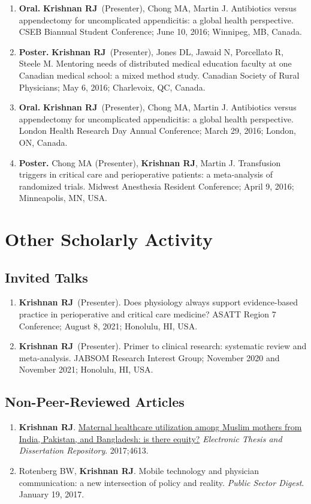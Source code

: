 \documentclass[10.5pt,letterpaper]{article}
\newcommand{\myname}{\textbf{Krishnan RJ}}
\begin{document}
\begin{enumerate}
\item \textbf{Oral.} \myname\ (Presenter), Chong MA, Martin J. Antibiotics versus appendectomy for uncomplicated appendicitis: a global health perspective. CSEB Biannual Student Conference; June 10, 2016; Winnipeg, MB, Canada.
\item \textbf{Poster.} \myname\ (Presenter), Jones DL, Jawaid N, Porcellato R, Steele M. Mentoring needs of distributed medical education faculty at one Canadian medical school: a mixed method study. Canadian Society of Rural Physicians; May 6, 2016; Charlevoix, QC, Canada.
\item \textbf{Oral.} \myname\ (Presenter), Chong MA, Martin J. Antibiotics versus appendectomy for uncomplicated appendicitis: a global health perspective. London Health Research Day Annual Conference; March 29, 2016; London, ON, Canada.
\item \textbf{Poster.} Chong MA (Presenter), \myname, Martin J. Transfusion triggers in critical care and perioperative patients: a meta-analysis of randomized trials. Midwest Anesthesia Resident Conference; April 9, 2016; Minneapolis, MN, USA.
\end{enumerate}

\section{Other Scholarly Activity}
\subsection{Invited Talks}
\begin{enumerate}
\item \myname\ (Presenter). Does physiology always support evidence-based practice in perioperative and critical care medicine? ASATT Region 7 Conference; August 8, 2021; Honolulu, HI, USA.
\item \myname\ (Presenter). Primer to clinical research: systematic review and meta-analysis. JABSOM Research Interest Group; November 2020 and November 2021; Honolulu, HI, USA.
\end{enumerate}
\subsection{Non-Peer-Reviewed Articles}
\begin{enumerate}
\item \myname. \href{https://ir.lib.uwo.ca/etd/461}{Maternal healthcare utilization among Muslim mothers from India, Pakistan, and Bangladesh: is there equity?} \textit{Electronic Thesis and Dissertation Repository}. 2017;4613.
\item Rotenberg BW, \myname. Mobile technology and physician communication: a new intersection of policy and reality. \textit{Public Sector Digest}. January 19, 2017.
\end{enumerate}
\end{document}
